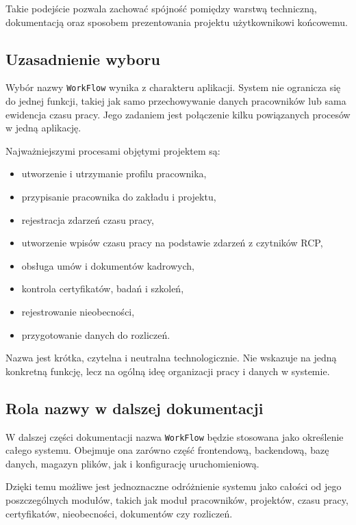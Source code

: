 Takie podejście pozwala zachować spójność pomiędzy warstwą techniczną, dokumentacją oraz sposobem prezentowania projektu użytkownikowi końcowemu.

\subsection{Uzasadnienie wyboru}

Wybór nazwy \texttt{WorkFlow} wynika z charakteru aplikacji. System nie ogranicza się do jednej funkcji, takiej jak samo przechowywanie danych pracowników lub sama ewidencja czasu pracy. Jego zadaniem jest połączenie kilku powiązanych procesów w jedną aplikację.

Najważniejszymi procesami objętymi projektem są:
\begin{itemize}
    \item utworzenie i utrzymanie profilu pracownika,
    \item przypisanie pracownika do zakładu i projektu,
    \item rejestracja zdarzeń czasu pracy,
    \item utworzenie wpisów czasu pracy na podstawie zdarzeń z czytników RCP,
    \item obsługa umów i dokumentów kadrowych,
    \item kontrola certyfikatów, badań i szkoleń,
    \item rejestrowanie nieobecności,
    \item przygotowanie danych do rozliczeń.
\end{itemize}

Nazwa jest krótka, czytelna i neutralna technologicznie. Nie wskazuje na jedną konkretną funkcję, lecz na ogólną ideę organizacji pracy i danych w systemie.

\subsection{Rola nazwy w dalszej dokumentacji}

W dalszej części dokumentacji nazwa \texttt{WorkFlow} będzie stosowana jako określenie całego systemu. Obejmuje ona zarówno część frontendową, backendową, bazę danych, magazyn plików, jak i konfigurację uruchomieniową.

Dzięki temu możliwe jest jednoznaczne odróżnienie systemu jako całości od jego poszczególnych modułów, takich jak moduł pracowników, projektów, czasu pracy, certyfikatów, nieobecności, dokumentów czy rozliczeń.